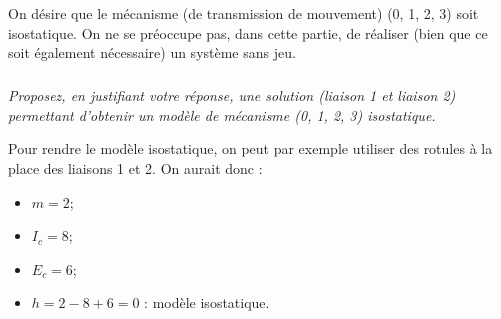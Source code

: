 \ifprof
\else
On désire que le mécanisme (de transmission de mouvement) (0, 1, 2, 3) soit isostatique. On ne se
préoccupe pas, dans cette partie, de réaliser (bien que ce soit également nécessaire) un système sans jeu.
\fi

\subparagraph{\label{q_20}}\textit{Proposez, en justifiant votre réponse, une solution (liaison 1 et liaison 2) permettant d’obtenir un
modèle de mécanisme (0, 1, 2, 3) isostatique.}
\ifprof
\begin{corrige}
Pour rendre le modèle isostatique, on peut par exemple utiliser des rotules à la place des liaisons 1 et 2. 
On aurait donc :
\begin{itemize}
\item $m=2$;
\item $I_c = 8$;
\item $E_c = 6$;
\item $h=2-8+6=0$ : modèle isostatique. 
\end{itemize}
\end{corrige}
\else
\fi